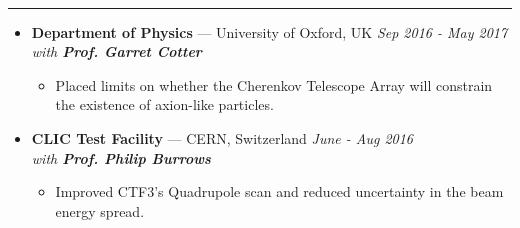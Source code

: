 \documentclass[11pt, oneside]{article}
\newenvironment{ressection}[1]{
	\vspace{4pt}
	{\selectfont\Large\color{Mycolor2}{\textbf{#1}}}
	\vspace{-6.5pt} \\
	\textcolor{Mycolor2}{\rule{\textwidth}{0.7pt}}
	\begin{itemize}
	\vspace{3pt}
}{
	\end{itemize}
}
\newcommand{\ressubitem}{
	\vspace{-4pt}
	\item
}
\newcommand{\resbigitem}[3]{
	\vspace{-5pt}
	\item[]
	\textbf{#1} --- #2 %
	\hfill
	\textit{#3}
}
\newenvironment{ressubsec}[3]{
	\resbigitem{#1}{#2}{#3}
	\vspace{-2pt}
	\begin{itemize}
}{
	\end{itemize}
}
\begin{document}
\begin{ressection}{\textbf{Research}}
	\vspace{2pt}
	\begin{ressubsec}{Department of Physics}{University of Oxford, UK}{Sep 2016 - May 2017 \\ with \textbf{Prof. Garret Cotter}}
		\ressubitem{Placed limits on whether the Cherenkov Telescope Array will constrain the existence of axion-like particles.}
	\end{ressubsec}

	\vspace{2pt}

	\begin{ressubsec}{CLIC Test Facility}{CERN, Switzerland}{June - Aug 2016 \\ with \textbf{Prof. Philip Burrows}}
\ressubitem{Improved CTF3's Quadrupole scan and reduced uncertainty in the beam energy spread.}
	\end{ressubsec}



\end{ressection}

\end{document}
